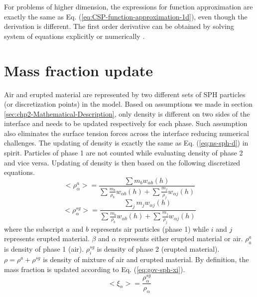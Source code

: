 For problems of higher dimension, the expressions for function approximation are exactly the same as Eq. (\ref{eq:CSP-function-approximation-1d}), even though the derivation is different. The first order derivative can be obtained by solving system of equations explicitly or numerically \citep{chen1999improvement}.

\section{Mass fraction update}
Air and erupted material are represented by two different sets of SPH particles (or discretization points) in the model. Based on assumptions we made in section \ref{sec:chp2-Mathematical-Description}, only density is different on two sides of the interface and needs to be updated respectively for each phase. Such assumption also eliminates the surface tension forces across the interface reducing numerical challenges. The updating of density is exactly the same as Eq. (\ref{eq:ns-sph-d}) in spirit. Particles of phase 1 are not counted while evaluating density of phase 2 and vice versa. Updating of density is then based on the following discretized equations.
\begin{equation}
<\rho_{\alpha}^a>=\frac{\sum m_b w_{\alpha b} \left(h\right)}{\sum \frac{m_b}{\rho_b} w_{\alpha b} \left(h\right) +\sum \frac{m_j}{\rho_j} w_{\alpha j} \left(h\right)} \label{eq:gov-sph-d1}
\end{equation}
\begin{equation}
<\rho_\alpha^{sg}>=\frac{\sum_j m_j w_{\alpha j} \left(h\right)}{\sum \frac{m_b}{\rho_b} w_{\alpha b} \left(h\right) +\sum \frac{m_j}{\rho_j} w_{\alpha j} \left(h\right)} \label{eq:gov-sph-d2}
\end{equation}
where the subscript $a$ and $b$ represents air particles (phase 1) while $i$ and $j$ represents erupted material. $\beta$ and $\alpha$ represents either erupted material or air.
$\rho_a^a$ is density of phase 1 (air). 
 $\rho_i^{sg}$ is density of phase 2 (erupted material).
$\rho=\rho^a + \rho^{sg}$ is density of mixture of air and erupted material. 
By definition, the mass fraction is updated according to Eq. (\ref{eq:gov-sph-xi}).
\begin{equation}
<\xi_{\alpha}> = \dfrac{\rho^{sg}_{\alpha}}{\rho_{\alpha}}
\label{eq:gov-sph-xi}
\end{equation}

